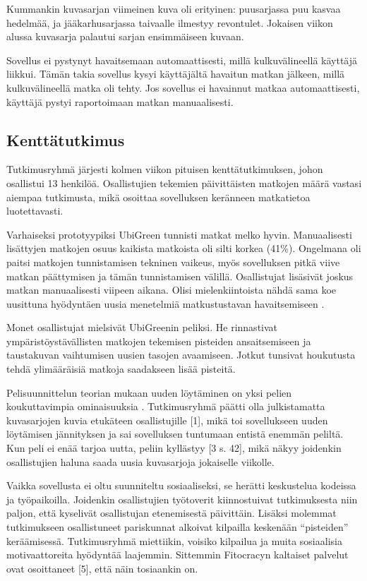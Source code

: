 \documentclass[finnish]{tktltiki2}
\theoremstyle{definition}
\theoremstyle{remark}
\begin{document}
Kummankin kuvasarjan viimeinen kuva oli erityinen: puusarjassa puu kasvaa hedelmää, ja jääkarhusarjassa taivaalle ilmestyy revontulet. Jokaisen viikon alussa kuvasarja palautui sarjan ensimmäiseen kuvaan.

Sovellus ei pystynyt havaitsemaan automaattisesti, millä kulkuvälineellä käyttäjä liikkui. Tämän takia sovellus kysyi käyttäjältä havaitun matkan jälkeen, millä kulkuvälineellä matka oli tehty. Jos sovellus ei havainnut matkaa automaattisesti, käyttäjä pystyi raportoimaan matkan manuaalisesti.

\subsection{Kenttätutkimus}
Tutkimusryhmä järjesti kolmen viikon pituisen kenttätutkimuksen, johon osallistui 13 henkilöä. Osallistujien tekemien päivittäisten matkojen määrä vastasi aiempaa tutkimusta, mikä osoittaa sovelluksen keränneen matkatietoa luotettavasti.

Varhaiseksi prototyypiksi UbiGreen tunnisti matkat melko hyvin. Manuaalisesti lisättyjen matkojen osuus kaikista matkoista oli silti korkea (41\%).
Ongelmana oli paitsi matkojen tunnistamisen tekninen vaikeus, myös sovelluksen pitkä viive matkan päättymisen ja tämän tunnistamisen välillä.
Osallistujat lisäsivät joskus matkan manuaalisesti viipeen aikana.
Olisi mielenkiintoista nähdä sama koe uusittuna hyödyntäen uusia menetelmiä matkustustavan havaitsemiseen \cite{hemminki}.

Monet osallistujat mielsivät UbiGreenin peliksi. He rinnastivat ympäristöystävällisten matkojen tekemisen pisteiden ansaitsemiseen ja taustakuvan vaihtumisen uusien tasojen avaamiseen. Jotkut tunsivat houkutusta tehdä ylimääräisiä matkoja saadakseen lisää pisteitä. 

Pelisuunnittelun teorian mukaan uuden löytäminen on yksi pelien koukuttavimpia ominaisuuksia \cite[s.~90]{theoryoffun}\cite[s.~109]{gamedesign}. Tutkimusryhmä päätti olla julkistamatta kuvasarjojen kuvia etukäteen osallistujille [1], mikä toi sovellukseen uuden löytämisen jännityksen ja sai sovelluksen tuntumaan entistä enemmän peliltä. Kun peli ei enää tarjoa uutta, peliin kyllästyy [3 s. 42], mikä näkyy joidenkin osallistujien haluna saada uusia kuvasarjoja jokaiselle viikolle.

Vaikka sovellusta ei oltu suunniteltu sosiaaliseksi, se herätti keskustelua kodeissa ja työpaikoilla. Joidenkin osallistujien työtoverit kiinnostuivat tutkimuksesta niin paljon, että kyselivät osallistujan etenemisestä päivittäin. Lisäksi molemmat tutkimukseen osallistuneet pariskunnat alkoivat kilpailla keskenään “pisteiden” keräämisessä. Tutkimusryhmä miettiikin, voisiko kilpailua ja muita sosiaalisia motivaattoreita hyödyntää laajemmin. Sittemmin Fitocracyn kaltaiset palvelut ovat osoittaneet [5], että näin tosiaankin on.
\end{document}

